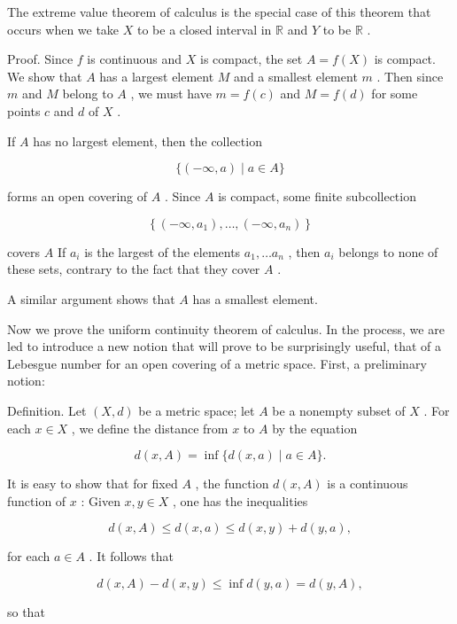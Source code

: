 \documentclass[10pt]{article}
\begin{document}
The extreme value theorem of calculus is the special case of this theorem that occurs when we take \(X\) to be a closed interval in \(\mathbb{R}\) and \(Y\) to be \(\mathbb{R}\) .

Proof. Since \(f\) is continuous and \(X\) is compact, the set \(A = f\left( X\right)\) is compact. We show that \(A\) has a largest element \(M\) and a smallest element \(m\) . Then since \(m\) and \(M\) belong to \(A\) , we must have \(m = f\left( c\right)\) and \(M = f\left( d\right)\) for some points \(c\) and \(d\) of \(X\) .

If \(A\) has no largest element, then the collection

\[
\{ \left( {-\infty ,a}\right)  \mid  a \in  A\}
\]

forms an open covering of \(A\) . Since \(A\) is compact, some finite subcollection

\[
\left\{  {\left( {-\infty ,{a}_{1}}\right) ,\ldots ,\left( {-\infty ,{a}_{n}}\right) }\right\}
\]

covers \(A\) If \({a}_{i}\) is the largest of the elements \({a}_{1},\ldots {a}_{n}\) , then \({a}_{i}\) belongs to none of these sets, contrary to the fact that they cover \(A\) .

A similar argument shows that \(A\) has a smallest element.

Now we prove the uniform continuity theorem of calculus. In the process, we are led to introduce a new notion that will prove to be surprisingly useful, that of a Lebesgue number for an open covering of a metric space. First, a preliminary notion:

Definition. Let \(\left( {X,d}\right)\) be a metric space; let \(A\) be a nonempty subset of \(X\) . For each \(x \in  X\) , we define the distance from \(x\) to \(A\) by the equation

\[
d\left( {x,A}\right)  = \inf \{ d\left( {x,a}\right)  \mid  a \in  A\} .
\]

It is easy to show that for fixed \(A\) , the function \(d\left( {x,A}\right)\) is a continuous function of \(x\) : Given \(x,y \in  X\) , one has the inequalities

\[
d\left( {x,A}\right)  \leq  d\left( {x,a}\right)  \leq  d\left( {x,y}\right)  + d\left( {y,a}\right) ,
\]

for each \(a \in  A\) . It follows that

\[
d\left( {x,A}\right)  - d\left( {x,y}\right)  \leq  \inf d\left( {y,a}\right)  = d\left( {y,A}\right) ,
\]

so that
\end{document}
